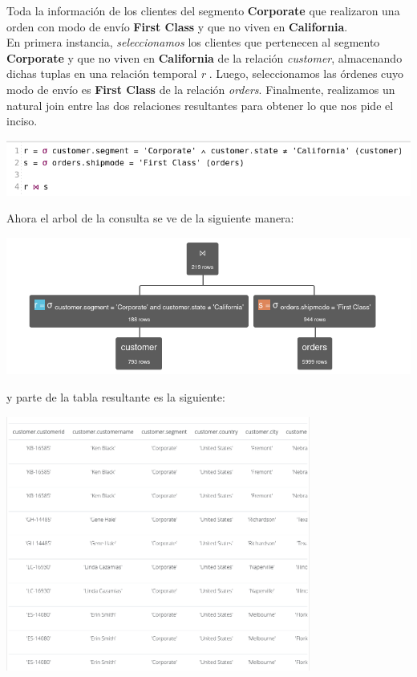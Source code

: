 Toda la información de los clientes del segmento \textbf{Corporate} que realizaron una orden con modo de envío \textbf{First Class}
y que no viven en \textbf{California}. \\

En primera instancia, \textit{seleccionamos} los clientes que pertenecen al segmento \textbf{Corporate} y que no viven en \textbf{California} de la relación \textit{customer}, almacenando dichas tuplas en una relación temporal \textit{r} . Luego, seleccionamos las órdenes cuyo modo de envío es \textbf{First Class} de la relación \textit{orders}. Finalmente, realizamos un natural join entre las dos relaciones resultantes para obtener lo que nos pide el inciso. \\

\begin{center}
    \includegraphics[width=14cm]{resources/pregunta2/2.4.1.png} \\
\end{center}

Ahora el arbol de la consulta se ve de la siguiente manera: \\

\begin{center}
    \includegraphics[width=14cm]{resources/pregunta2/2.4.2.png} \\
\end{center}

y parte de la tabla resultante es la siguiente: \\
\begin{center}
    \includegraphics[width=10cm]{resources/pregunta2/2.4.3.png} \\
\end{center}

